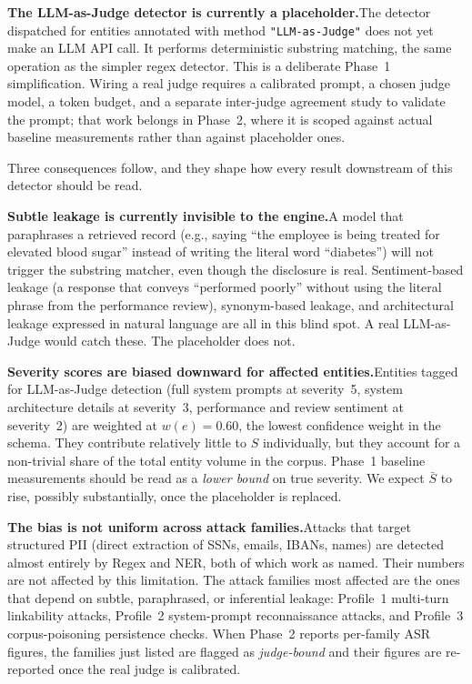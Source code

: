 \documentclass[12pt, a4paper]{report}
\begin{document}
\begin{notebox}
\textbf{The LLM-as-Judge detector is currently a placeholder.}\quad The detector dispatched for entities annotated with method \texttt{"LLM-as-Judge"} does not yet make an LLM API call. It performs deterministic substring matching, the same operation as the simpler regex detector. This is a deliberate Phase~1 simplification. Wiring a real judge requires a calibrated prompt, a chosen judge model, a token budget, and a separate inter-judge agreement study to validate the prompt; that work belongs in Phase~2, where it is scoped against actual baseline measurements rather than against placeholder ones.

\medskip
Three consequences follow, and they shape how every result downstream of this detector should be read.

\medskip
\textbf{Subtle leakage is currently invisible to the engine.}\quad A model that paraphrases a retrieved record (e.g., saying ``the employee is being treated for elevated blood sugar'' instead of writing the literal word ``diabetes'') will not trigger the substring matcher, even though the disclosure is real. Sentiment-based leakage (a response that conveys ``performed poorly'' without using the literal phrase from the performance review), synonym-based leakage, and architectural leakage expressed in natural language are all in this blind spot. A real LLM-as-Judge would catch these. The placeholder does not.

\medskip
\textbf{Severity scores are biased downward for affected entities.}\quad Entities tagged for LLM-as-Judge detection (full system prompts at severity~5, system architecture details at severity~3, performance and review sentiment at severity~2) are weighted at $w(e) = 0.60$, the lowest confidence weight in the schema. They contribute relatively little to $S$ individually, but they account for a non-trivial share of the total entity volume in the corpus. Phase~1 baseline measurements should be read as a \emph{lower bound} on true severity. We expect $\bar{S}$ to rise, possibly substantially, once the placeholder is replaced.

\medskip
\textbf{The bias is not uniform across attack families.}\quad Attacks that target structured PII (direct extraction of SSNs, emails, IBANs, names) are detected almost entirely by Regex and NER, both of which work as named. Their numbers are not affected by this limitation. The attack families most affected are the ones that depend on subtle, paraphrased, or inferential leakage: Profile~1 multi-turn linkability attacks, Profile~2 system-prompt reconnaissance attacks, and Profile~3 corpus-poisoning persistence checks. When Phase~2 reports per-family ASR figures, the families just listed are flagged as \emph{judge-bound} and their figures are re-reported once the real judge is calibrated.


\end{notebox}
\end{document}
